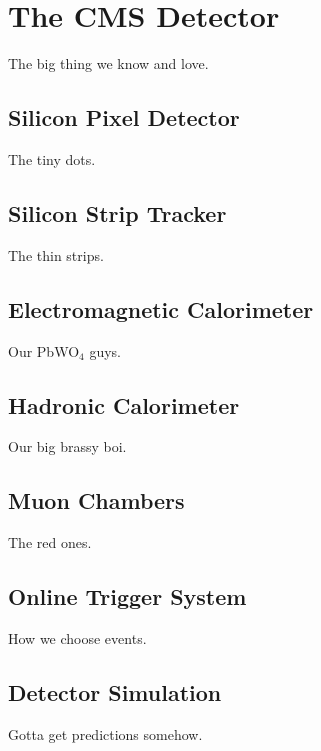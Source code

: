 \chapter{The CMS Detector}

The big thing we know and love.

\section{Silicon Pixel Detector}

The tiny dots.

\section{Silicon Strip Tracker}

The thin strips.

\section{Electromagnetic Calorimeter}

Our PbWO$_{4}$ guys.

\section{Hadronic Calorimeter}

Our big brassy boi.

\section{Muon Chambers}

The red ones.

\section{Online Trigger System}

How we choose events.

\section{Detector Simulation}

Gotta get predictions somehow.



